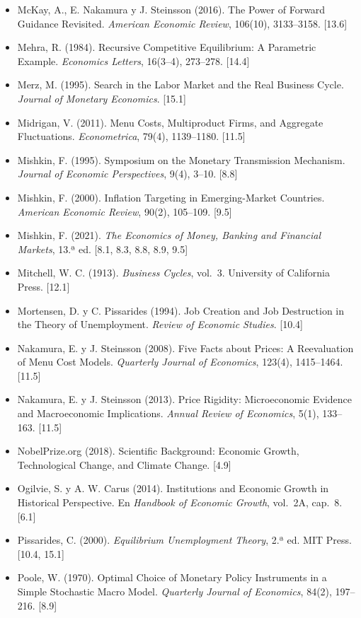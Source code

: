 \documentclass[11pt,a4paper]{article}
\begin{document}
{\begin{itemize}[leftmargin=1.4em,itemsep=1pt,label={}]
\item McKay, A., E. Nakamura y J. Steinsson (2016). The Power of Forward Guidance Revisited. \emph{American Economic Review}, 106(10), 3133--3158. [13.6]
\item Mehra, R. (1984). Recursive Competitive Equilibrium: A Parametric Example. \emph{Economics Letters}, 16(3--4), 273--278. [14.4]
\item Merz, M. (1995). Search in the Labor Market and the Real Business Cycle. \emph{Journal of Monetary Economics}. [15.1]
\item Midrigan, V. (2011). Menu Costs, Multiproduct Firms, and Aggregate Fluctuations. \emph{Econometrica}, 79(4), 1139--1180. [11.5]
\item Mishkin, F. (1995). Symposium on the Monetary Transmission Mechanism. \emph{Journal of Economic Perspectives}, 9(4), 3--10. [8.8]
\item Mishkin, F. (2000). Inflation Targeting in Emerging-Market Countries. \emph{American Economic Review}, 90(2), 105--109. [9.5]
\item Mishkin, F. (2021). \emph{The Economics of Money, Banking and Financial Markets}, 13.ª ed. [8.1, 8.3, 8.8, 8.9, 9.5]
\item Mitchell, W. C. (1913). \emph{Business Cycles}, vol.~3. University of California Press. [12.1]
\item Mortensen, D. y C. Pissarides (1994). Job Creation and Job Destruction in the Theory of Unemployment. \emph{Review of Economic Studies}. [10.4]
\item Nakamura, E. y J. Steinsson (2008). Five Facts about Prices: A Reevaluation of Menu Cost Models. \emph{Quarterly Journal of Economics}, 123(4), 1415--1464. [11.5]
\item Nakamura, E. y J. Steinsson (2013). Price Rigidity: Microeconomic Evidence and Macroeconomic Implications. \emph{Annual Review of Economics}, 5(1), 133--163. [11.5]
\item NobelPrize.org (2018). Scientific Background: Economic Growth, Technological Change, and Climate Change. [4.9]
\item Ogilvie, S. y A. W. Carus (2014). Institutions and Economic Growth in Historical Perspective. En \emph{Handbook of Economic Growth}, vol.~2A, cap.~8. [6.1]
\item Pissarides, C. (2000). \emph{Equilibrium Unemployment Theory}, 2.ª ed. MIT Press. [10.4, 15.1]
\item Poole, W. (1970). Optimal Choice of Monetary Policy Instruments in a Simple Stochastic Macro Model. \emph{Quarterly Journal of Economics}, 84(2), 197--216. [8.9]

\end{itemize}}
\end{document}
